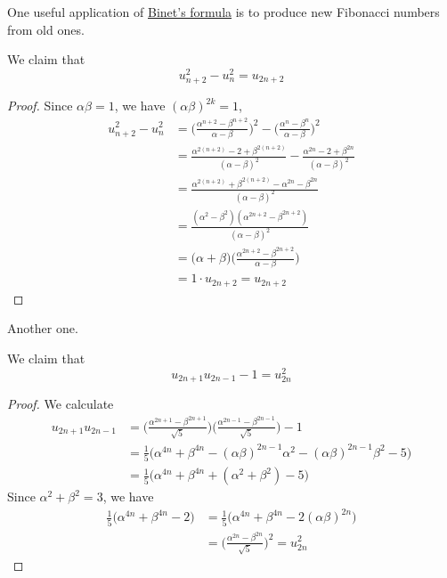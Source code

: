 \documentclass{article}
\begin{document}
One useful application of \hyperref[thm:binets-formula]{Binet's formula} is to produce new Fibonacci numbers from old ones. 

\begin{corollary}
  \label{thm:difference-of-squares-of-fibonacci-numbers}
We claim that
\begin{equation}
  u_{n+2}^2 - u_n^2 = u_{2n+2}
\end{equation}
\end{corollary}
\begin{proof}
Since $\alpha \beta = 1$, we have $(\alpha \beta)^{2k} = 1$, 
\begin{align*}
    u_{n+2}^2 - u_n^2 & = \bigg(\frac{ \alpha^{n+2} - \beta^{n+2}}{\alpha - \beta} \bigg)^2 - \bigg( \frac{\alpha^n - \beta^n}{\alpha - \beta}\bigg)^2 \\
    & = \frac{\alpha^{2(n+2)} - 2 + \beta^{2(n+2)}}{(\alpha - \beta)^2} - \frac{\alpha^{2n} - 2 + \beta^{2n}}{(\alpha - \beta)^2} \\
    & = \frac{\alpha^{2(n+2)} + \beta^{2(n+2)} - \alpha^{2n} - \beta^{2n}}{(\alpha-\beta)^2} \\
    & = \frac{(\alpha^2-\beta^2) (\alpha^{2n+2} - \beta^{2n+2})}{(\alpha-\beta)^2} \\
    & = \big( \alpha + \beta \big) \bigg( \frac{\alpha^{2n+2} - \beta^{2n+2}}{\alpha - \beta} \bigg) \\
    & = 1 \cdot u_{2n+2} = u_{2n+2}
\end{align*}
\end{proof}

Another one. 

\begin{corollary}
  \label{thm:catalan-type-identity-for-fibonacci-numbers}
We claim that 
\begin{equation}
  u_{2n+1} u_{2n-1} - 1 = u_{2n}^2
\end{equation}
\end{corollary}
\begin{proof}
We calculate
\begin{align*}
    u_{2n+1} u_{2n-1} & = \bigg( \frac{\alpha^{2n+1} - \beta^{2n+1}}{\sqrt{5}}\bigg) \bigg( \frac{\alpha^{2n-1} - \beta^{2n-1}}{\sqrt{5}}\bigg) - 1 \\
    & = \frac{1}{5} \big( \alpha^{4n} + \beta^{4n} - (\alpha \beta)^{2n-1} \alpha^2 - (\alpha \beta)^{2n-1} \beta^2 - 5 \big) \\
    & = \frac{1}{5} \big( \alpha^{4n} + \beta^{4n} + (\alpha^2 + \beta^2) - 5 \big)
\end{align*}
Since $\alpha^2 + \beta^2 = 3$, we have 
\begin{align*}
    \frac{1}{5} \big( \alpha^{4n} + \beta^{4n} - 2 \big) & = \frac{1}{5} \big( \alpha^{4n} + \beta^{4n} - 2 (\alpha \beta)^{2n} \big) \\
    & = \bigg( \frac{\alpha^{2n} - \beta^{2n}}{\sqrt{5}} \bigg)^2 = u_{2n}^2
\end{align*}
\end{proof}
\end{document}
